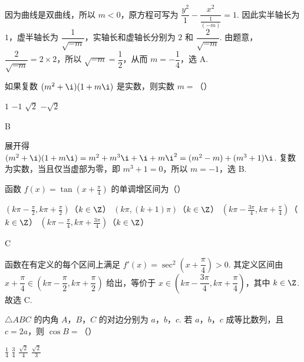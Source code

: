 \begin{solution}
因为曲线是双曲线，所以 \(m<0\)，原方程可写为 \(\dfrac{y^2}{1}-\dfrac{x^2}{\frac{1}{(-m)}}=1\). 因此实半轴长为 \(1\)，虚半轴长为 \(\dfrac{1}{\sqrt{-m}}\)，实轴长和虚轴长分别为 \(2\) 和 \(\dfrac{2}{\sqrt{-m}}\). 由题意，\(\dfrac{2}{\sqrt{-m}}=2\times2\)，所以 \(\sqrt{-m}=\dfrac12\)，从而 \(m=-\dfrac14\)，选 A.
\end{solution}

\begin{problem}
如果复数 \((m^2 + \i)(1 + m\i)\) 是实数，则实数 \(m=\)（\quad）

\choices
    {\(1\)}
    {\(-1\)}
    {\(\sqrt{2}\)}
    {\(-\sqrt{2}\)}
\end{problem}

\begin{answer}
B
\end{answer}

\begin{solution}
展开得 \((m^2+\i)(1+m\i)=m^2+m^3\i+\i+m\i^2=(m^2-m)+(m^3+1)\i\). 复数为实数，当且仅当虚部为零，即 \(m^3+1=0\)，所以 \(m=-1\)，选 B.
\end{solution}

\begin{problem}
函数 \(f(x)=\tan\left(x+\frac{\pi}{4}\right)\) 的单调增区间为（\quad）

\choices
    {\(\left(k\pi-\frac{\pi}{2},k\pi+\frac{\pi}{2}\right)\)（\(k\in\Z\)）}
    {\((k\pi,(k+1)\pi)\)（\(k\in\Z\)）}
    {\(\left(k\pi-\frac{3\pi}{4},k\pi+\frac{\pi}{4}\right)\)（\(k\in\Z\)）}
    {\(\left(k\pi-\frac{\pi}{4},k\pi+\frac{3\pi}{4}\right)\)（\(k\in\Z\)）}
\end{problem}

\begin{answer}
C
\end{answer}

\begin{solution}
函数在有定义的每个区间上满足 \(f'(x)=\sec^2\left(x+\dfrac{\pi}{4}\right)>0\). 其定义区间由 \(x+\dfrac{\pi}{4}\in\left(k\pi-\dfrac{\pi}{2},k\pi+\dfrac{\pi}{2}\right)\) 给出，等价于 \(x\in\left(k\pi-\dfrac{3\pi}{4},k\pi+\dfrac{\pi}{4}\right)\)，其中 \(k\in\Z\). 故选 C.
\end{solution}

\begin{problem}
\(\triangle ABC\) 的内角 \(A\)，\(B\)，\(C\) 的对边分别为 \(a\)，\(b\)，\(c\). 若 \(a\)，\(b\)，\(c\) 成等比数列，且 \(c=2a\)，则 \(\cos B=\)（\quad）

\choices
    {\(\frac14\)}
    {\(\frac34\)}
    {\(\frac{\sqrt2}{4}\)}
    {\(\frac{\sqrt2}{3}\)}
\end{problem}

